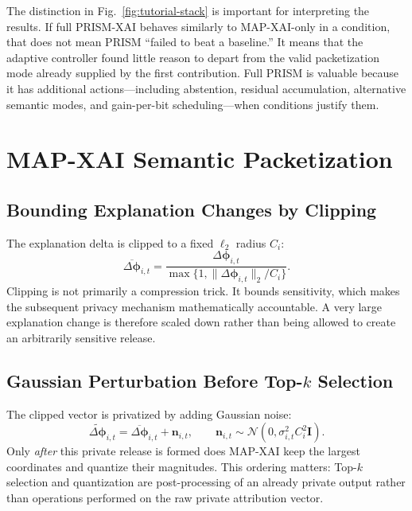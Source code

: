 \documentclass[11pt]{article}
\begin{document}
The distinction in Fig.~\ref{fig:tutorial-stack} is important for interpreting the results. If full PRISM-XAI behaves similarly to MAP-XAI-only in a condition, that does not mean PRISM ``failed to beat a baseline.'' It means that the adaptive controller found little reason to depart from the valid packetization mode already supplied by the first contribution. Full PRISM is valuable because it has additional actions---including abstention, residual accumulation, alternative semantic modes, and gain-per-bit scheduling---when conditions justify them.

\section{MAP-XAI Semantic Packetization}
\subsection{Bounding Explanation Changes by Clipping}
The explanation delta is clipped to a fixed $\ell_2$ radius $C_i$:
\begin{equation}
\overline{\Delta\boldsymbol{\phi}}_{i,t}=
\frac{\Delta\boldsymbol{\phi}_{i,t}}
{\max\{1,\|\Delta\boldsymbol{\phi}_{i,t}\|_2/C_i\}}.
\label{eq:tutorial-clip}
\end{equation}
Clipping is not primarily a compression trick. It bounds sensitivity, which makes the subsequent privacy mechanism mathematically accountable. A very large explanation change is therefore scaled down rather than being allowed to create an arbitrarily sensitive release.

\subsection{Gaussian Perturbation Before \texorpdfstring{Top-$k$}{Top-k} Selection}
The clipped vector is privatized by adding Gaussian noise:
\begin{equation}
\widetilde{\Delta\boldsymbol{\phi}}_{i,t}=
\overline{\Delta\boldsymbol{\phi}}_{i,t}+\mathbf{n}_{i,t},
\qquad
\mathbf{n}_{i,t}\sim\mathcal{N}(0,\sigma_{i,t}^2 C_i^2\mathbf I).
\label{eq:tutorial-gauss}
\end{equation}
Only \emph{after} this private release is formed does MAP-XAI keep the largest coordinates and quantize their magnitudes. This ordering matters: Top-$k$ selection and quantization are post-processing of an already private output rather than operations performed on the raw private attribution vector.
\end{document}
